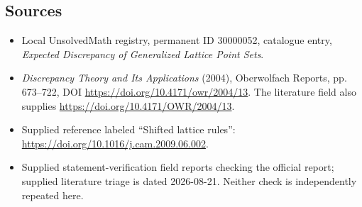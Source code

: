 \documentclass[11pt]{article}
\begin{document}
\subsection{Sources}
\begin{itemize}
\item Local UnsolvedMath registry, permanent ID 30000052, catalogue entry, \emph{Expected Discrepancy of Generalized Lattice Point Sets}.
\item \emph{Discrepancy Theory and Its Applications} (2004), Oberwolfach Reports, pp. 673--722, DOI \url{https://doi.org/10.4171/owr/2004/13}. The literature field also supplies \url{https://doi.org/10.4171/OWR/2004/13}.
\item Supplied reference labeled ``Shifted lattice rules'': \url{https://doi.org/10.1016/j.cam.2009.06.002}.
\item Supplied statement-verification field reports checking the official report; supplied literature triage is dated 2026-08-21. Neither check is independently repeated here.
\end{itemize}
\end{document}
